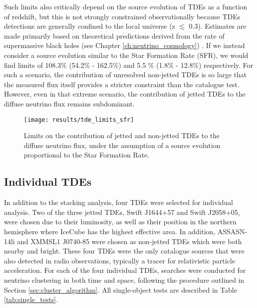 Such limits also critically depend on the source evolution of TDEs as a function of redshift, but this is not strongly constrained observationally because TDEs detections are generally confined to the local universe (z $\lesssim$ 0.3). Estimates are made primarily based on theoretical predictions derived from the rate of supermassive black holes (see Chapter \ref{ch:neutrino_cosmology}) \cite{Sun:2015bda}. If we instead consider a source evolution similar to the Star Formation Rate (SFR), we would find limits of 108.3\% (54.2\% - 162.5\%) and 5.5 \% (1.8\% - 12.8\%) respectively. For such a scenario, the contribution of unresolved non-jetted TDEs is so large that the measured flux itself provides a stricter constraint than the catalogue test. However, even in that extreme scenario, the contribution of jetted TDEs to the diffuse neutrino flux remains subdominant.

\begin{figure}[!ht]
	\centering \texttt{[image: results/tde\_limits\_sfr]}
	\caption{Limits on the contribution of jetted and non-jetted TDEs to the diffuse neutrino flux, under the assumption of a source evolution proportional to the Star Formation Rate.}
	\label{fig:DiffuseFluxSRF}
\end{figure}

\subsection{Individual TDEs}

In addition to the stacking analysis, four TDEs were selected for individual analysis. Two of the three jetted TDEs, Swift J1644+57 and Swift J2058+05, were chosen due to their luminosity, as well as their position in the northern hemisphere where IceCube has the highest effective area. In addition, ASSASN-14li and  XMMSL1 J0740-85 were chosen as non-jetted TDEs which were both nearby and bright. These four TDEs were the only catalogue sources that were also detected in radio observations, typically a tracer for relativistic particle acceleration. For each of the four individual TDEs, searches were conducted for neutrino clustering in both time and space, following the procedure outlined in Section \ref{sec:cluster_algorithm}. All single-object tests are described in Table \ref{tab:single_tests}.


